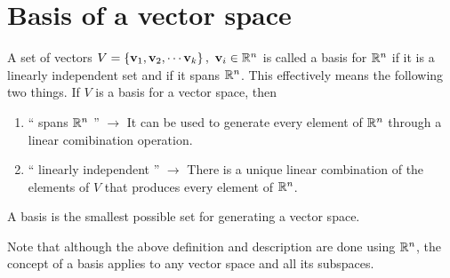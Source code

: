 \section{Basis of a vector space}
A set of vectors $V = \left\{ \mathbf{v}_1, \mathbf{v}_2,  \cdots \mathbf{v}_k \right\}, \,\, \mathbf{v}_i \in \mathbb{R}^n$ is called a basis for $\mathbb{R}^n$ if it is a linearly independent set and if it spans $\mathbb{R}^n$. This effectively means the following two things. If $V$ is a basis for a vector space, then
\begin{enumerate}
    \item `` spans $\mathbb{R}^n$ '' $\longrightarrow$ It can be used to generate every element of $\mathbb{R}^n$ through a linear comibination operation.
    \item `` linearly independent '' $\longrightarrow$ There is a unique linear combination of the elements of $V$ that produces every element of $\mathbb{R}^n$.
\end{enumerate}
A basis is the smallest possible set for generating a vector space. 

Note that although the above definition and description are done using $\mathbb{R}^n$, the concept of a basis applies to any vector space and all its subspaces.

